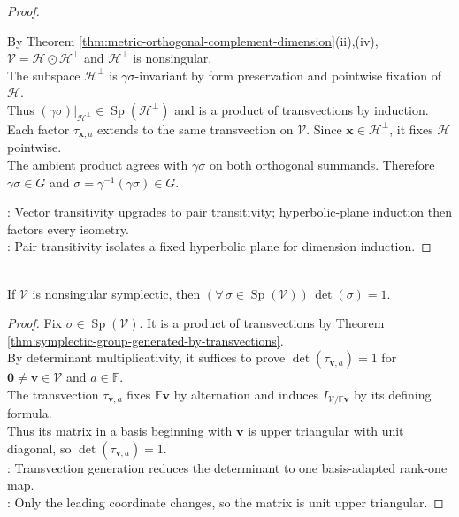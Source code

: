 \begin{theorem}
\begin{proof}
\begin{enumerate}[label=(\roman*)]
By Theorem \ref{thm:metric-orthogonal-complement-dimension}(ii),(iv), $\mathcal{V}=\mathcal{H}\odot\mathcal{H}^{\perp}$ and $\mathcal{H}^{\perp}$ is nonsingular.\\
The subspace $\mathcal{H}^{\perp}$ is $\gamma\sigma$-invariant by form preservation and pointwise fixation of $\mathcal{H}$.\\
Thus $(\gamma\sigma)|_{\mathcal{H}^{\perp}}\in\operatorname{Sp}(\mathcal{H}^{\perp})$ and is a product of transvections by induction.\\
Each factor $\tau_{\mathbf{x},a}$ extends to the same transvection on $\mathcal{V}$. Since $\mathbf{x}\in\mathcal{H}^{\perp}$, it fixes $\mathcal{H}$ pointwise.\\
The ambient product agrees with $\gamma\sigma$ on both orthogonal summands. Therefore $\gamma\sigma\in G$ and $\sigma=\gamma^{-1}(\gamma\sigma)\in G$.
\end{enumerate}
: Vector transitivity upgrades to pair transitivity; hyperbolic-plane induction then factors every isometry.\\
: Pair transitivity isolates a fixed hyperbolic plane for dimension induction.
\end{proof}
\end{theorem}

\begin{proposition} \label{prop:symplectic-transformations-have-determinant-one} \\
If $\mathcal{V}$ is nonsingular symplectic, then $(\forall\,\sigma\in\operatorname{Sp}(\mathcal{V}))\,\det(\sigma)=1$.
\begin{proof}
Fix $\sigma\in\operatorname{Sp}(\mathcal{V})$. It is a product of transvections by Theorem \ref{thm:symplectic-group-generated-by-transvections}.\\
By determinant multiplicativity, it suffices to prove $\det(\tau_{\mathbf{v},a})=1$ for $\mathbf{0}\neq\mathbf{v}\in\mathcal{V}$ and $a\in\mathbb{F}$.\\
The transvection $\tau_{\mathbf{v},a}$ fixes $\mathbb{F}\mathbf{v}$ by alternation and induces $I_{\mathcal{V}/\mathbb{F}\mathbf{v}}$ by its defining formula.\\
Thus its matrix in a basis beginning with $\mathbf{v}$ is upper triangular with unit diagonal, so $\det(\tau_{\mathbf{v},a})=1$.\\
: Transvection generation reduces the determinant to one basis-adapted rank-one map.\\
: Only the leading coordinate changes, so the matrix is unit upper triangular.
\end{proof}
\end{proposition}

